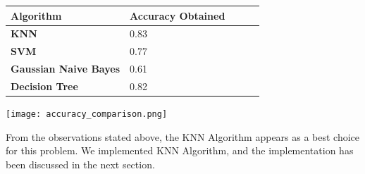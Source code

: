 \begin{center}
\begin{minipage}[t]{.45\textwidth}
\begin{tabular}{@{}lllll@{}}
\toprule
\textbf{Algorithm}                  & Accuracy Obtained &  &  &  \\ \midrule
\textbf{KNN}                  & 0.83 &  &  &  \\ 
\textbf{SVM}                  & 0.77 &  &  &  \\
\textbf{Gaussian Naive Bayes} & 0.61 &  &  &  \\
\textbf{Decision Tree}                & 0.82 &  &  &  \\ \bottomrule
\end{tabular}
\end{minipage}
\end{center}

\begin{Figure*}
  \texttt{[image: accuracy\_comparison.png]}
  \label{fig:algocomparison}
\end{Figure*}


From the observations stated above, the KNN Algorithm appears as a best choice for this problem. We implemented KNN Algorithm, and the implementation has been discussed in the next section.

